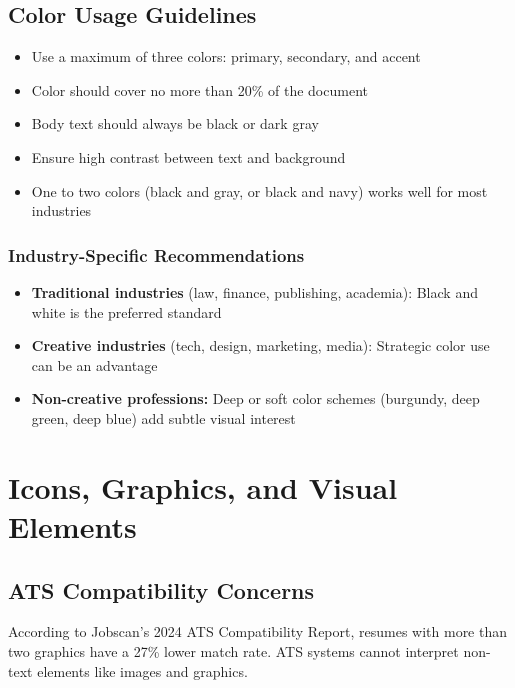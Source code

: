\documentclass[11pt,a4paper]{article}
\begin{document}
\subsection{Color Usage Guidelines}

\begin{bestpractice}
\begin{itemize}[noitemsep]
    \item Use a maximum of three colors: primary, secondary, and accent
    \item Color should cover no more than 20\% of the document
    \item Body text should always be black or dark gray
    \item Ensure high contrast between text and background
    \item One to two colors (black and gray, or black and navy) works well for most industries
\end{itemize}
\end{bestpractice}

\subsubsection{Industry-Specific Recommendations}

\begin{itemize}
    \item \textbf{Traditional industries} (law, finance, publishing, academia): Black and white is the preferred standard
    \item \textbf{Creative industries} (tech, design, marketing, media): Strategic color use can be an advantage
    \item \textbf{Non-creative professions:} Deep or soft color schemes (burgundy, deep green, deep blue) add subtle visual interest
\end{itemize}

\section{Icons, Graphics, and Visual Elements}

\subsection{ATS Compatibility Concerns}

\begin{keystat}
According to Jobscan's 2024 ATS Compatibility Report, resumes with more than two graphics have a 27\% lower match rate. ATS systems cannot interpret non-text elements like images and graphics.
\end{keystat}
\end{document}
